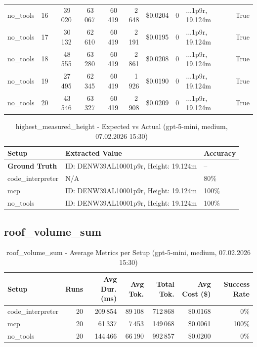 \documentclass[a4paper,11pt]{article}
\begin{document}
\begin{table}[H]
{\begin{tabular}{l r r r r r r r l r}
no\_tools & 16 & 39\,020 & 63\,067 & 60\,419 & 2\,648 & \$0.0204 & 0 & ...1p9r, 19.124m & True \\
no\_tools & 17 & 30\,132 & 62\,610 & 60\,419 & 2\,191 & \$0.0195 & 0 & ...1p9r, 19.124m & True \\
no\_tools & 18 & 48\,555 & 63\,280 & 60\,419 & 2\,861 & \$0.0208 & 0 & ...1p9r, 19.124m & True \\
no\_tools & 19 & 27\,495 & 62\,345 & 60\,419 & 1\,926 & \$0.0190 & 0 & ...1p9r, 19.124m & True \\
no\_tools & 20 & 43\,546 & 63\,327 & 60\,419 & 2\,908 & \$0.0209 & 0 & ...1p9r, 19.124m & True \\
\bottomrule
\end{tabular}}
\end{table}

\begin{table}[H]
\centering
\scriptsize
\caption{highest\_measured\_height - Expected vs Actual (gpt-5-mini, medium, 07.02.2026 15:30)}
\begin{tabular}{l l l}
\toprule
Setup & Extracted Value & Accuracy \\
\midrule
\textbf{Ground Truth} & ID: DENW39AL10001p9r, Height: 19.124m & -- \\
\midrule
code\_interpreter & N/A & 80\% \\
mcp & ID: DENW39AL10001p9r, Height: 19.124m & 100\% \\
no\_tools & ID: DENW39AL10001p9r, Height: 19.124m & 100\% \\
\bottomrule
\end{tabular}
\end{table}

\clearpage

\subsection{roof\_volume\_sum}

\begin{table}[H]
\centering
\scriptsize
\caption{roof\_volume\_sum - Average Metrics per Setup (gpt-5-mini, medium, 07.02.2026 15:30)}
\label{tab:combined\_roof\_volume\_sum\_metrics\_20260207}
\begin{tabular}{l r r r r r r}
\toprule
Setup & Runs & Avg Dur. (ms) & Avg Tok. & Total Tok. & Avg Cost (\$) & Success Rate \\
\midrule
code\_interpreter & 20 & 209\,854 & 89\,108 & 712\,868 & \$0.0168 & 0\% \\
mcp & 20 & 61\,337 & 7\,453 & 149\,068 & \$0.0061 & 100\% \\
no\_tools & 20 & 144\,466 & 66\,190 & 992\,857 & \$0.0200 & 0\% \\
\bottomrule
\end{tabular}
\end{table}
\end{document}
